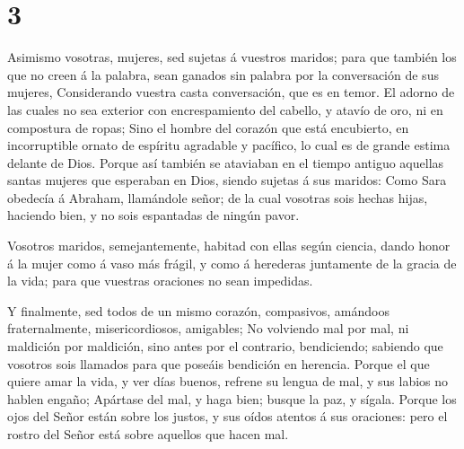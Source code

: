 \hypertarget{section-2}{%
\section{3}\label{section-2}}

 Asimismo vosotras, mujeres, sed sujetas á vuestros maridos;
para que también los que no creen á la palabra, sean ganados sin palabra
por la conversación de sus mujeres,  Considerando vuestra
casta conversación, que es en temor.  El adorno de las
cuales no sea exterior con encrespamiento del cabello, y atavío de oro,
ni en compostura de ropas;  Sino el hombre del corazón que
está encubierto, en incorruptible ornato de espíritu agradable y
pacífico, lo cual es de grande estima delante de Dios. 
Porque así también se ataviaban en el tiempo antiguo aquellas santas
mujeres que esperaban en Dios, siendo sujetas á sus maridos:
 Como Sara obedecía á Abraham, llamándole señor; de la cual
vosotras sois hechas hijas, haciendo bien, y no sois espantadas de
ningún pavor.

 Vosotros maridos, semejantemente, habitad con ellas según
ciencia, dando honor á la mujer como á vaso más frágil, y como á
herederas juntamente de la gracia de la vida; para que vuestras
oraciones no sean impedidas.

 Y finalmente, sed todos de un mismo corazón, compasivos,
amándoos fraternalmente, misericordiosos, amigables;  No
volviendo mal por mal, ni maldición por maldición, sino antes por el
contrario, bendiciendo; sabiendo que vosotros sois llamados para que
poseáis bendición en herencia.  Porque el que quiere amar
la vida, y ver días buenos, refrene su lengua de mal, y sus labios no
hablen engaño;  Apártase del mal, y haga bien; busque la
paz, y sígala.  Porque los ojos del Señor están sobre los
justos, y sus oídos atentos á sus oraciones: pero el rostro del Señor
está sobre aquellos que hacen mal.

